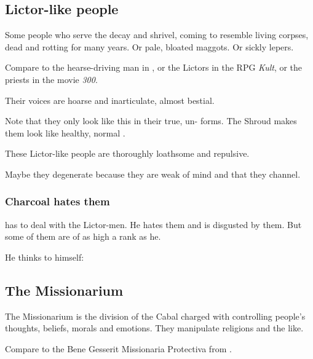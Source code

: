 \subsection{Lictor-like people}
\label{Lictors}
Some people who serve the \banes{} decay and shrivel, coming to resemble living corpses, dead and rotting for many years. Or pale, bloated maggots. Or sickly lepers. 

Compare to the hearse-driving man in , or the Lictors in the RPG \emph{Kult}, or the priests in the movie \emph{300}.

Their voices are hoarse and inarticulate, almost bestial.

Note that they only look like this in their true, un- forms. The Shroud makes them look like healthy, normal \humans.

These Lictor-like people are thoroughly loathsome and repulsive. 

Maybe they degenerate because they are weak of mind and  that they channel.





\subsubsection{Charcoal hates them}
 has to deal with the Lictor-men. He hates them and is disgusted by them. But some of them are of as high a rank as he. 

He thinks to himself: 









\subsection{The Missionarium}
The Missionarium is the division of the Cabal charged with controlling people's thoughts, beliefs, morals and emotions. They manipulate religions and the like. 

Compare to the Bene Gesserit Missionaria Protectiva from . 









